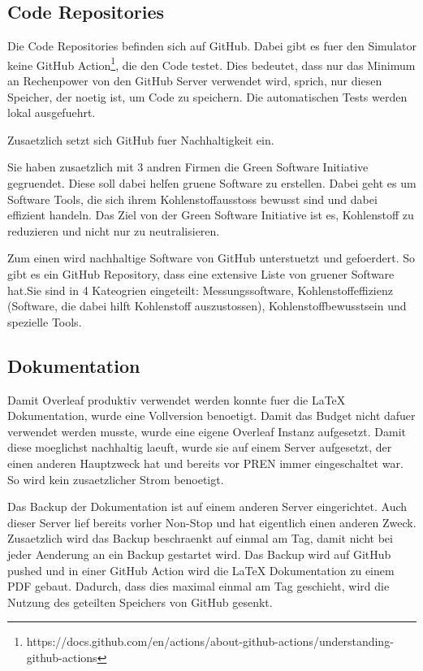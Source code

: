 \subsection{Code Repositories}

Die Code Repositories befinden sich auf GitHub. Dabei gibt es fuer den Simulator keine GitHub Action\footnote{https://docs.github.com/en/actions/about-github-actions/understanding-github-actions}, die den Code testet. Dies bedeutet, dass nur das Minimum an Rechenpower von den GitHub Server verwendet wird, sprich, nur diesen Speicher, der noetig ist, um Code zu speichern. Die automatischen Tests werden lokal ausgefuehrt.

Zusaetzlich setzt sich GitHub fuer Nachhaltigkeit ein.\cite{github-sustainability}


Sie haben zusaetzlich mit 3 andren Firmen die Green Software Initiative gegruendet. Diese soll dabei helfen gruene Software zu erstellen.  Dabei geht es um Software Tools, die sich ihrem Kohlenstoffausstoss bewusst sind und dabei effizient handeln. Das Ziel von der Green Software Initiative ist es, Kohlenstoff zu reduzieren und nicht nur zu neutralisieren.\cite{green-software-initiative}

Zum einen wird nachhaltige Software von GitHub unterstuetzt und gefoerdert. So gibt es ein GitHub Repository, dass eine extensive Liste von gruener Software hat.Sie sind in 4 Kateogrien eingeteilt: Messungssoftware, Kohlenstoffeffizienz (Software, die dabei hilft Kohlenstoff auszustossen), Kohlenstoffbewusstsein und spezielle Tools. \cite{green-software}







\subsection{Dokumentation}

Damit Overleaf produktiv verwendet werden konnte fuer die LaTeX Dokumentation, wurde eine Vollversion benoetigt. Damit das Budget nicht dafuer verwendet werden musste, wurde eine eigene Overleaf Instanz aufgesetzt. Damit diese moeglichst nachhaltig laeuft, wurde sie auf einem Server aufgesetzt, der einen anderen Hauptzweck hat und bereits vor PREN immer eingeschaltet war. So wird kein zusaetzlicher Strom benoetigt.

Das Backup der Dokumentation ist auf einem anderen Server eingerichtet. Auch dieser Server lief bereits vorher Non-Stop und hat eigentlich einen anderen Zweck. Zusaetzlich wird das Backup beschraenkt auf einmal am Tag, damit nicht bei jeder Aenderung an ein Backup gestartet wird. Das Backup wird auf GitHub pushed und in einer GitHub Action wird die LaTeX Dokumentation zu einem PDF gebaut. Dadurch, dass dies maximal einmal am Tag geschieht, wird die Nutzung des geteilten Speichers von GitHub gesenkt.

